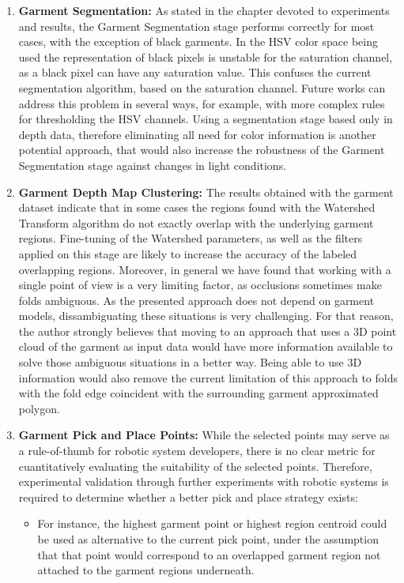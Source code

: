 \begin{enumerate}
	\item \textbf{Garment Segmentation:} As stated in the chapter devoted to experiments and results, the Garment Segmentation stage performs correctly for most cases, with the exception of black garments. In the HSV color space being used the representation of black pixels is unstable for the saturation channel, as a black pixel can have any saturation value. This confuses the current segmentation algorithm, based on the saturation channel. Future works can address this problem in several ways, for example, with more complex rules for thresholding the HSV channels. Using a segmentation stage based only in depth data, therefore eliminating all need for color information is another potential approach, that would also increase the robustness of the Garment Segmentation stage against changes in light conditions.
	
	\item \textbf{Garment Depth Map Clustering:} The results obtained with the garment dataset indicate that in some cases the regions found with the Watershed Transform algorithm do not exactly overlap with the underlying garment regions. Fine-tuning of the Watershed parameters, as well as the filters applied on this stage are likely to increase the accuracy of the labeled overlapping regions. Moreover, in general we have found that working with a single point of view is a very limiting factor, as occlusions sometimes make folds ambiguous. As the presented approach does not depend on garment models, dissambiguating these situations is very challenging. For that reason, the author strongly believes that moving to an approach that uses a 3D point cloud of the garment as input data would have more information available to solve those ambiguous situations in a better way. Being able to use 3D information would also remove the current limitation of this approach to folds with the fold edge coincident with the surrounding garment approximated polygon.

	\item \textbf{Garment Pick and Place Points:} While the selected points may serve as a rule-of-thumb for robotic system developers, there is no clear metric for cuantitatively evaluating the suitability of the selected points. Therefore, experimental validation through further experiments with robotic systems is required to determine whether a better pick and place strategy exists:
	
\begin{itemize}
\item For instance, the highest garment point or highest region centroid could be used as alternative to the current pick point, under the assumption that that point would correspond to an overlapped garment region not attached to the garment regions underneath.


\end{itemize}
\end{enumerate}
